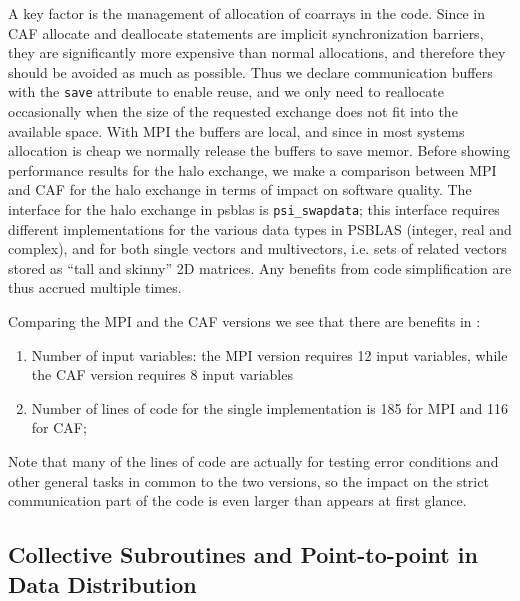 \documentclass{IOS-Book-Article}
\begin{document}
A key factor is the management of  allocation of coarrays in the
code. Since in CAF allocate and deallocate statements are implicit
synchronization barriers, they are significantly more expensive than
normal allocations, and therefore  they should be
avoided as much as possible.  Thus we declare communication
buffers with the \verb|save| attribute to enable reuse, and we only
need to reallocate occasionally when the size of the requested
exchange does not fit into the available space. 
 With MPI the buffers are local, and since in most systems allocation
 is cheap we normally release the buffers to save memor.
Before showing performance results for  the halo exchange, we 
make a comparison between MPI and CAF for the halo exchange in terms
of impact on software quality.  
The interface for the halo exchange in psblas is \verb|psi_swapdata|;
this interface requires different implementations for the various data
types  in PSBLAS (integer, real and complex), and  for both single
vectors and multivectors, i.e. sets of related vectors stored as
``tall and skinny'' 2D matrices. Any benefits from code simplification
are thus accrued multiple times.

Comparing the  MPI and the CAF versions we see that there are benefits
in : 
\begin{enumerate}
\item Number of input variables: the MPI version requires 12 input
  variables, while the CAF version requires 8 input variables 
\item Number of lines of code for the single implementation is 185 for
  MPI and 116 for CAF;  
\end{enumerate}
Note that many of the lines of code are actually for testing error
conditions and other general tasks in common to the two versions, so
the impact on the strict communication part of the code is even larger
than appears at first glance. 
  
\subsection{Collective Subroutines and Point-to-point in Data Distribution}
\end{document}
